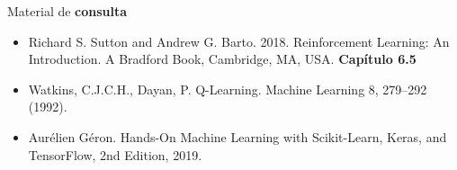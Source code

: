 \documentclass{beamer}
\begin{document}
\begin{frame}{Material de \textbf{consulta}}
	\begin{itemize}
		\item Richard S. Sutton and Andrew G. Barto. 2018. Reinforcement Learning: An Introduction. A Bradford Book, Cambridge, MA, USA. \textbf{Capítulo 6.5}
		\item Watkins, C.J.C.H., Dayan, P. Q-Learning. Machine Learning 8, 279–292 (1992). \href{https://doi.org/10.1007/BF00992698}{}
		\item Aurélien Géron. Hands-On Machine Learning with Scikit-Learn, Keras, and TensorFlow, 2nd Edition, 2019. 
	\end{itemize}
\end{frame}
\end{document}
